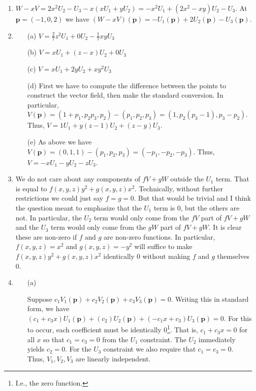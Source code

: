 \documentclass[12pt]{article}
\numberwithin{theorem}{section}
\numberwithin{equation}{section}
\numberwithin{remark}{section}
\numberwithin{definition}{section}
\numberwithin{theorem}{section}
\numberwithin{lemma}{section}
\numberwithin{example}{section}
\begin{document}
\begin{enumerate}
{\begin{enumerate}
		\end{enumerate}
	}
	\item{$W - xV = 2x^2U_2 - U_3-x\left(xU_1+yU_2\right)=-x^2U_1+(2x^2-xy)U_2-U_3$. At $\textbf{p}=(-1,0,2)$ we have $(W-xV)(\textbf{p})=-U_1(\textbf{p})+2U_2(\textbf{p})-U_3(\textbf{p})$.}
	\item{
		\begin{enumerate}
			\item[(a)]{$V=\frac{2}{7}z^2U_1+0U_2-\frac{1}{7}xyU_3$}
			\item[(b)]{$V=xU_1+(z-x)U_2+0U_3$}
			\item[(c)]{$V=xU_1+2yU_2+xy^2U_3$}
			\item[(d)]{First we have to compute the difference between the points to construct the vector field, then make the standard conversion. In particular, $V(\textbf{p})=(1+p_1,p_2p_3,p_2)-(p_1,p_2,p_3)=(1,p_2(p_3-1),p_3-p_2)$. Thus, $V=1U_1+y(z-1)U_2+(z-y)U_3$.}
			\item[(e)]{As above we have $V(\textbf{p})=(0,1,1)-(p_1,p_2,p_3)=(-p_1,-p_2,-p_3)$. Thus, $V=-xU_1-yU_2-zU_3$.}
		\end{enumerate}
	}
	\item{We do not care about any components of $fV+gW$ outside the $U_1$ term. That is equal to $f(x,y,z)y^2+g(x,y,z)x^2$. Technically, without further restrictions we could just say $f=g=0$. But that would be trivial and I think the question meant to emphasize that the $U_1$ term is 0, but the others are not. In particular, the $U_2$ term would only come from the $fV$ part of $fV+gW$ and the $U_3$ term would only come from the $gW$ part of $fV+gW$. It is clear these are non-zero if $f$ and $g$ are non-zero functions. In particular, $f(x,y,z)=x^2$ and $g(x,y,z)=-y^2$ will suffice to make $f(x,y,z)y^2+g(x,y,z)x^2$ identically 0 without making $f$ and $g$ themselves 0.}
	\item{
		\begin{enumerate}
			\item[(a)]{Suppose $c_1V_1(\textbf{p})+c_2V_2(\textbf{p})+c_3V_3(\textbf{p})=0$. Writing this in standard form, we have $(c_1+c_3x)U_1(\textbf{p})+(c_2)U_2(\textbf{p})+(-c_1x+c_3)U_3(\textbf{p})=0.$ For this to occur, each coefficient must be identically 0\footnote{I.e., the zero function.}. That is, $c_1+c_3x=0$ for all $x$ so that $c_1=c_3=0$ from the $U_1$ constraint. The $U_2$ immediately yields $c_2=0$. For the $U_3$ constraint we also require that $c_1=c_3=0$. Thus, $V_1,V_2,V_3$ are linearly independent.
			
}
\end{enumerate}}
\end{enumerate}
\end{document}
